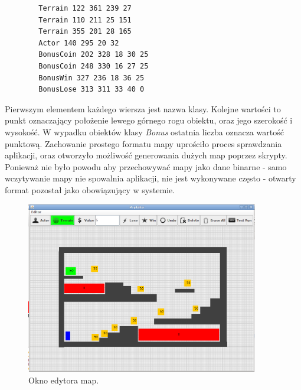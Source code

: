 \begin{par}
\begin{par}
	\begin{lstlisting}
		Terrain 122 361 239 27
		Terrain 110 211 25 151
		Terrain 355 201 28 165
		Actor 140 295 20 32
		BonusCoin 202 328 18 30 25
		BonusCoin 248 330 16 27 25
		BonusWin 327 236 18 36 25
		BonusLose 313 311 33 40 0
	\end{lstlisting}

	Pierwszym elementem każdego wiersza jest nazwa klasy.
	Kolejne wartości to punkt oznaczający położenie lewego górnego rogu obiektu, oraz jego szerokość i wysokość.
	W wypadku obiektów klasy \textit{Bonus} ostatnia liczba oznacza wartość punktową. 
	Zachowanie prostego formatu mapy uprościło proces sprawdzania aplikacji, oraz otworzyło możliwość generowania dużych map poprzez skrypty.
	Ponieważ nie było powodu aby przechowywać mapy jako dane binarne - samo wczytywanie mapy nie spowalnia aplikacji, nie jest wykonywane często - otwarty format pozostał jako obowiązujący w systemie.
\end{par}

		\begin{figure}[!h]
		\centering
		\includegraphics[width=4in]{obrazki/map_editor.png}
		\caption{Okno edytora map.}
		\label{fig:map_editor}
	\end{figure}
\end{par}




